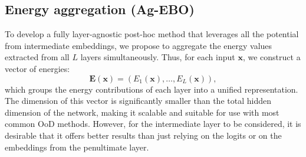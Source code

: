 \documentclass[10pt,twocolumn,a4paper]{article}
\def\rvx{{\mathbf{x}}}
\begin{document}
\begin{table*}[t]
    \centering
    \caption{AUROC scores of MDSEns, EBO, BHL and three aggregation methods with \textsc{CIFAR-10} as $\mathcal{D}_{\text{in}}$, averaged over 3 runs.}
    \label{tab:cifar10}
\end{table*}

\subsection{Energy aggregation (Ag-EBO)}\label{sec:aggregation}
To develop a fully layer-agnostic post-hoc method that leverages all the potential from intermediate embeddings, we propose to aggregate the energy values extracted from all \(L\) layers simultaneously. Thus, for each input $\rvx$, we construct a vector of energies:
\[
\mathbf{E}(\rvx) = (E_{1}(\rvx), \dots, E_{L}(\rvx)),
\]
which groups the energy contributions of each layer into a unified representation.
The dimension of this vector is significantly smaller than the total hidden dimension of the network, making it scalable and suitable for use with most common OoD methods. However, for the intermediate layer to be considered, it is desirable that it offers better results than just relying on the logits or on the embeddings from the penultimate layer.
\end{document}
